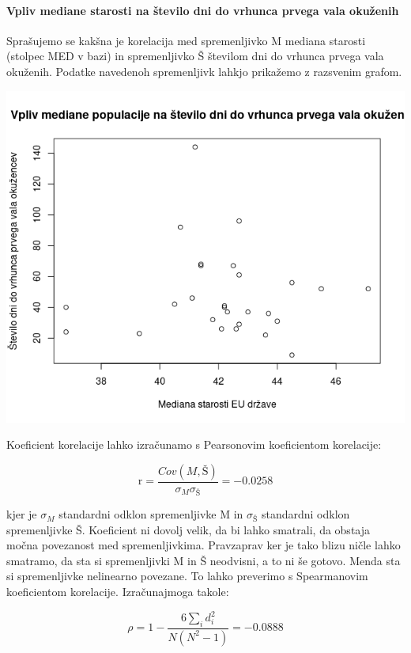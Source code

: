 \documentclass[a4paper,11pt]{article}
\begin{document}
\paragraph{Vpliv mediane starosti na število dni do vrhunca prvega vala okuženih}
Sprašujemo se kakšna je korelacija med spremenljivko M mediana starosti (stolpec MED v bazi) in spremenljivko Š številom dni do vrhunca prvega vala okuženih. Podatke navedenoh spremenljivk lahkjo prikažemo z razsvenim grafom.
\\
\begin{center}
\includegraphics[scale=0.6]{vpliv_med_populacije_na_st_dni_do_peaka_okuezenih}\\
\end{center}
Koeficient korelacije lahko izračunamo s Pearsonovim koeficientom korelacije:

\begin{center}
\[\text{r} = \frac{Cov(M,Š)}{\sigma_{M} \sigma_{Š}} = -0.0258\]
\end{center} 
kjer je \(\sigma_{M}\) standardni odklon spremenljivke M in \(\sigma_{Š}\) standardni odklon spremenljivke Š. Koeficient ni dovolj velik, da bi lahko smatrali, da obstaja močna povezanost med spremenljivkima. Pravzaprav ker je tako blizu ničle lahko smatramo, da sta si spremenljivki M in Š neodvisni, a to ni še gotovo. Menda sta si spremenljivke nelinearno povezane. To lahko preverimo s Spearmanovim koeficientom korelacije. Izračunajmoga takole: 

\begin{center}
\[\rho = 1 - \frac{6\sum_{i}{}d_i^2}{N(N^2 - 1)} = -0.0888\]
\end{center} 
\end{document}
